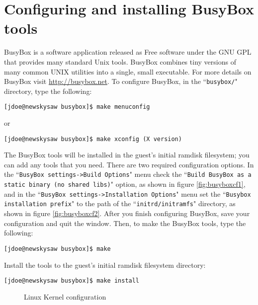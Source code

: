 \documentclass{article}[11pt]
\def\colfigsize{\epsfxsize=5in}
\begin{document}
\section{Configuring and installing BusyBox tools}

BusyBox is a software application released as Free software under the GNU GPL
that provides many standard Unix tools. BusyBox combines tiny versions of many
common UNIX utilities into a single, small executable. For more details on
BusyBox visit \url{http://busybox.net}. To configure BusyBox, in the
``\verb+busybox/+" directory, type the following:

\begin{verbatim}
[jdoe@newskysaw busybox]$ make menuconfig
\end{verbatim}

\noindent
or

\begin{verbatim}
[jdoe@newskysaw busybox]$ make xconfig (X version)
\end{verbatim}

\noindent
The BusyBox tools will be installed in the guest's initial ramdisk filesystem;
you can add any tools that you need. There are two required configuration
options. In the
``\verb|BusyBox settings->Build Options|" menu check the
``\verb|Build BusyBox as a static binary (no shared libs)|" option, as shown in
figure \ref{fig:busyboxcf1}, and in the
``\verb|BusyBox settings->Installation Options|" menu set the
``\verb|Busybox installation prefix|" to the path of the
``\verb|initrd/initramfs|" directory, as shown in figure \ref{fig:busyboxcf2}.
After you finish configuring BusyBox, save your configuration and quit the
window. Then, to make the BusyBox tools, type the following:

\begin{verbatim}
[jdoe@newskysaw busybox]$ make
\end{verbatim}
Install the tools to the guest's initial ramdisk filesystem directory:
\begin{verbatim}
[jdoe@newskysaw busybox]$ make install
\end{verbatim}

\begin{figure}[ht]
  \begin{center}
    \colfigsize{}
  \end{center}
  \caption{Linux Kernel configuration}
  \label{fig:linuxcf}
\end{figure}
\end{document}
